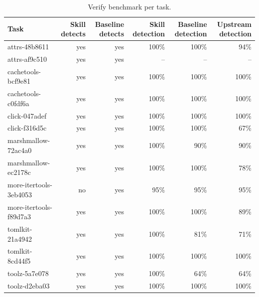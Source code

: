 \begin{table}[t]
\centering\small
\begin{tabular}{lrrrrr}
\toprule
Task & Skill detects & Baseline detects & Skill detection & Baseline detection & Upstream detection \\
\midrule
attrs-48b8611 & yes & yes & 100\% & 100\% & 94\% \\
attrs-af9c510 & yes & yes & -- & -- & -- \\
cachetools-bcf9e81 & yes & yes & 100\% & 100\% & 100\% \\
cachetools-c0fdf6a & yes & yes & 100\% & 100\% & 100\% \\
click-047adef & yes & yes & 100\% & 100\% & 100\% \\
click-f316d5c & yes & yes & 100\% & 100\% & 67\% \\
marshmallow-72ac4a0 & yes & yes & 100\% & 90\% & 90\% \\
marshmallow-ec2178c & yes & yes & 100\% & 100\% & 78\% \\
more-itertools-3eb4053 & no & yes & 95\% & 95\% & 95\% \\
more-itertools-f89d7a3 & yes & yes & 100\% & 100\% & 89\% \\
tomlkit-21a4942 & yes & yes & 100\% & 81\% & 71\% \\
tomlkit-8cd44f5 & yes & yes & 100\% & 100\% & 100\% \\
toolz-5a7e078 & yes & yes & 100\% & 64\% & 64\% \\
toolz-d2eba03 & yes & yes & 100\% & 100\% & 100\% \\
\bottomrule
\end{tabular}
\caption{Verify benchmark per task.}
\label{tab:bench2tasks}
\end{table}
